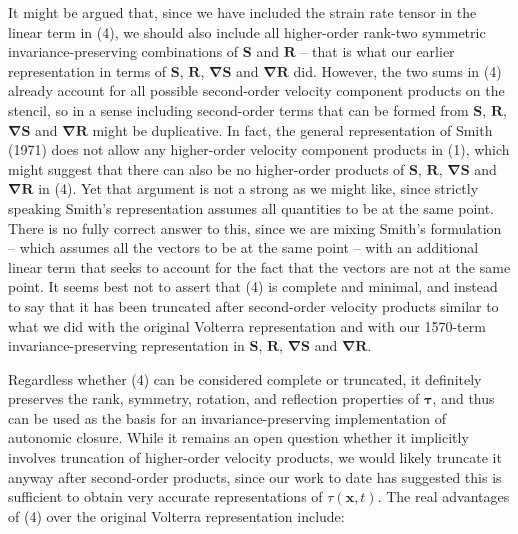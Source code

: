 It might be argued that, since we have included the strain rate tensor in the linear term in (4), we should also include all higher-order rank-two symmetric invariance-preserving combinations of $\mathbf{S}$ and $\mathbf{R}$ – that is what our earlier representation in terms of $\mathbf{S}$, $\mathbf{R}$, $\mathbf{\nabla S}$ and $\mathbf{\nabla R}$ did. However, the two sums in (4) already account for all possible second-order velocity component products on the stencil, so in a sense including second-order terms that can be formed from $\mathbf{S}$, $\mathbf{R}$, $\mathbf{\nabla S}$ and $\mathbf{\nabla R}$ might be duplicative. In fact, the general representation of Smith (1971) does not allow any higher-order velocity component products in (1), which might suggest that there can also be no higher-order products of $\mathbf{S}$, $\mathbf{R}$, $\mathbf{\nabla S}$ and $\mathbf{\nabla R}$ in (4). Yet that argument is not a strong as we might like, since strictly speaking Smith’s representation assumes all quantities to be at the same point.  There is no fully correct answer to this, since we are mixing Smith’s formulation – which assumes all the vectors to be at the same point -- with an additional linear term that seeks to account for the fact that the vectors are not at the same point. It seems best not to assert that (4) is complete and minimal, and instead to say that it has been truncated after second-order velocity products similar to what we did with the original Volterra representation and with our 1570-term invariance-preserving representation in $\mathbf{S}$, $\mathbf{R}$, $\mathbf{\nabla S}$ and $\mathbf{\nabla R}$.

Regardless whether (4) can be considered complete or truncated, it definitely preserves the rank, symmetry, rotation, and reflection properties of $\mathbf{\tau}$, and thus can be used as the basis for an invariance-preserving implementation of autonomic closure. While it remains an open question whether it implicitly involves truncation of higher-order velocity products, we would likely truncate it anyway after second-order products, since our work to date has suggested this is sufficient to obtain very accurate representations of $\tau(\mathbf{x},t)$. The real advantages of (4) over the original Volterra representation include:

